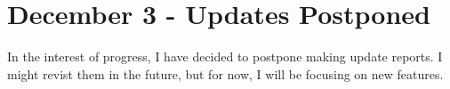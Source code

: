 \chapter{December 3 -\/ Updates Postponed}
\hypertarget{md_updates_21__12__03}{}\label{md_updates_21__12__03}
\label{md_updates_21__12__03_autotoc_md1}%
%
 In the interest of progress, I have decided to postpone making update reports. I might revist them in the future, but for now, I will be focusing on new features. 